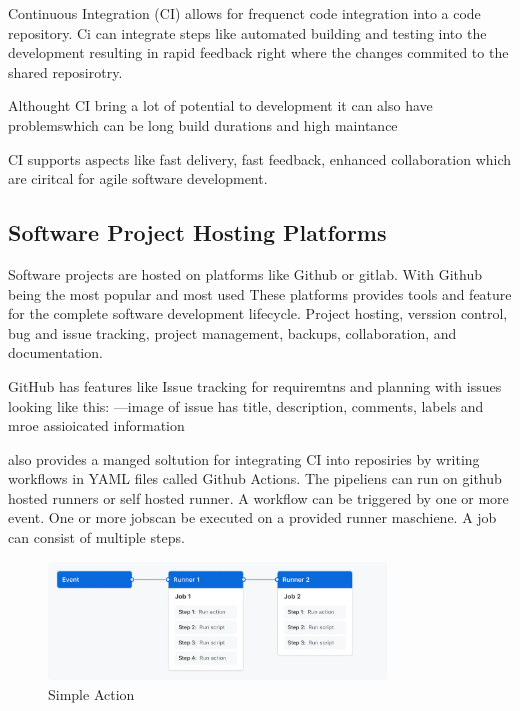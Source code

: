 Continuous Integration (CI) allows for frequenct code integration into a code repository. Ci can integrate steps like automated building and testing into the development resulting in rapid feedback right where the changes commited to the shared reposirotry.

Althought CI bring a lot of potential to development it can also have problemswhich can be long build durations and high maintance

CI supports aspects like fast delivery, fast feedback, enhanced collaboration which are ciritcal for agile software development. \cite{ugwuezeContinuousIntegrationDeployment2024}

\subsection{Software Project Hosting Platforms}
Software projects are hosted on platforms like Github or gitlab. With Github being the most popular and most used \cite{} These platforms provides tools and feature for the complete software development lifecycle. Project hosting, verssion control, bug and issue tracking, project management, backups, collaboration, and documentation. \cite{abrahamssonAgileSoftwareDevelopment2017}

GitHub has features like Issue tracking for requiremtns and planning with issues looking like this: \cite{githubdoc}
---image of issue
has title, description, comments, labels and mroe assioicated information

also provides a manged soltution for integrating CI into reposiries by writing workflows in YAML files called Github Actions. The pipeliens can run on github hosted runners or self hosted runner. A workflow can be triggered by one or more event. One or more jobscan be executed on a provided runner maschiene. A job can consist of multiple steps. \cite{Workflows}
\begin{figure}[htbp]
    \centering
    \includegraphics[width=0.8\textwidth]{images/overview-actions-simple.png}
    \caption{Simple Action}
    \label{fig:simple action}
\end{figure}

